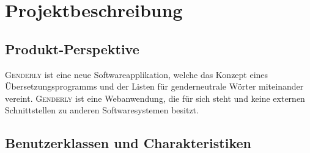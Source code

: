 \documentclass[paper=a4, parskip=half]{scrreprt}
\newcommand{\Genderly}{\textsc{Genderly}}
\begin{document}
\chapter{Projektbeschreibung}
\section{Produkt-Perspektive}
\Genderly{} ist eine neue Softwareapplikation, welche das Konzept eines Übersetzungsprogramms und der Listen für genderneutrale Wörter miteinander vereint. \Genderly{} ist eine Webanwendung, die für sich steht und keine externen Schnittstellen zu anderen Softwaresystemen besitzt.

\pagebreak

\section{Benutzerklassen und Charakteristiken}
\end{document}
